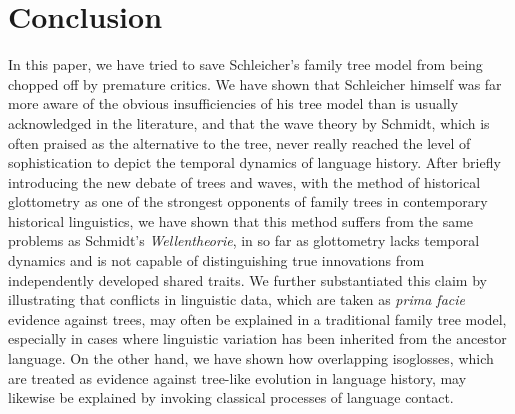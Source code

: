 \documentclass[svgnames,12pt]{scrartcl}
\begin{document}
{{\section{Conclusion}
In this paper, we have tried to save Schleicher's family tree model from being chopped off by premature critics. We have shown that Schleicher himself was far more aware of the obvious insufficiencies of his tree model than is usually acknowledged in the literature, and that the wave theory by Schmidt, which is often praised as the alternative to the tree, never really reached the level of sophistication to depict the temporal dynamics of language history.  After briefly introducing the new debate of trees and waves, with the method of historical glottometry as one of the strongest opponents of family trees in contemporary historical linguistics, we have shown that this method suffers from the same problems as Schmidt's \emph{Wellentheorie}, in so far as glottometry lacks temporal dynamics and is not capable of distinguishing true innovations from independently developed shared traits. We further substantiated this claim by illustrating that conflicts in linguistic data, which are taken as \emph{prima facie} evidence against trees, may often be explained in a traditional family tree model, especially in cases where linguistic variation has been inherited from the ancestor language. On the other hand, we have shown how overlapping isoglosses, which are treated as evidence against tree-like evolution in language history, may likewise be explained by
invoking classical processes of language contact.
 
}}
\end{document}
